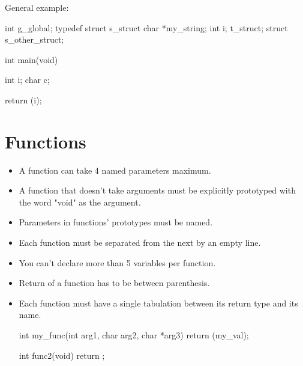 \documentclass{42-en}
\begin{document}
            General example:
            \begin{42ccode}
int             g_global;
typedef struct  s_struct
{
    char    *my_string;
    int     i;
}               t_struct;
struct          s_other_struct;

int     main(void)
{
    int     i;
    char    c;

    return (i);
}
            \end{42ccode}
            \newpage

    \section{Functions}

        \begin{itemize}

            \item A function can take 4 named parameters maximum.

            \item A function that doesn't take arguments must be
                explicitly prototyped with the word "void" as the
                argument.

            \item Parameters in functions' prototypes must be named.

            \item Each function must be separated from the next by
                an empty line.

            \item You can't declare more than 5 variables per function.

            \item Return of a function has to be between parenthesis. 

            \item Each function must have a single tabulation between its
                return type and its name.

            \begin{42ccode}
int my_func(int arg1, char arg2, char *arg3)
{
    return (my_val);
}

int func2(void)
{
    return ;
}
            \end{42ccode}

        \end{itemize}
        \newpage
\end{document}
